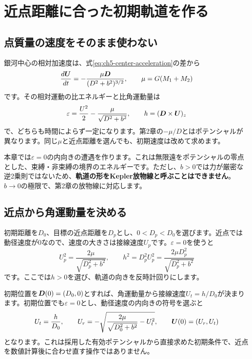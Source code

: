 
\section{近点距離に合った初期軌道を作る}
\label{sec:ch5-initial-orbit}
\subsection{点質量の速度をそのまま使わない}
銀河中心の相対加速度は、式\eqref{eq:ch5-center-acceleration}の差から
\begin{equation}
\frac{d\boldsymbol U}{dt}=-\frac{\mu\boldsymbol D}{(D^2+b^2)^{3/2}},\qquad \mu=G(M_1+M_2)
\label{eq:ch5-relative-ode}
\end{equation}
です。その相対運動の比エネルギーと比角運動量は
\begin{equation}
\varepsilon=\frac{U^2}{2}-\frac{\mu}{\sqrt{D^2+b^2}},\qquad h=(\boldsymbol D\times\boldsymbol U)_z
\label{eq:ch5-orbital-invariants}
\end{equation}
で、どちらも時間によらず一定になります。第2章の$-\mu/D$とはポテンシャルが異なります。同じ$\mu$と近点距離を選んでも、初期速度は改めて求めます。

本章では$\varepsilon=0$の内向きの遭遇を作ります。これは無限遠をポテンシャルの零点とした、束縛・非束縛の境界のエネルギーです。ただし、$b>0$では力が厳密な逆2乗則ではないため、\textbf{軌道の形をKepler放物線と呼ぶことはできません}。$b\to0$の極限で、第2章の放物線に対応します。

\subsection{近点から角運動量を決める}
初期距離を$D_0$、目標の近点距離を$D_p$とし、$0<D_p<D_0$を選びます。近点では動径速度が0なので、速度の大きさは接線速度$U_p$です。$\varepsilon=0$を使うと
\begin{equation}
U_p^2=\frac{2\mu}{\sqrt{D_p^2+b^2}},\qquad
h^2=D_p^2U_p^2=\frac{2\mu D_p^2}{\sqrt{D_p^2+b^2}}
\label{eq:ch5-pericenter-angular}
\end{equation}
です。ここでは$h>0$を選び、軌道の向きを反時計回りにします。

初期位置を$\boldsymbol D(0)=(D_0,0)$とすれば、角運動量から接線速度$U_t=h/D_0$が決まります。初期位置でも$\varepsilon=0$とし、動径速度の内向きの符号を選ぶと
\begin{equation}
U_t=\frac{h}{D_0},\qquad
U_r=-\sqrt{\frac{2\mu}{\sqrt{D_0^2+b^2}}-U_t^2},\qquad
\boldsymbol U(0)=(U_r,U_t)
\label{eq:ch5-incoming-speed}
\end{equation}
となります。これは採用した有効ポテンシャルから直接求めた初期条件で、近点を数値計算後に合わせ直す操作ではありません。

